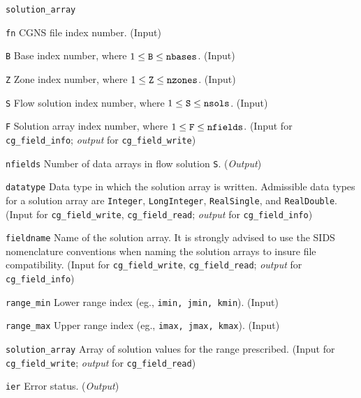 \begin{Ventryi}{\texttt{solution\_array}}\raggedright
\item [\texttt{fn}]
      CGNS file index number.
      (\textcolor{input}{Input})
\item [\texttt{B}]
      Base index number, where $1 \leq \text{\texttt{B}} \leq \text{\texttt{nbases}}$.
      (\textcolor{input}{Input})
\item [\texttt{Z}]
      Zone index number, where $1 \leq \text{\texttt{Z}} \leq \text{\texttt{nzones}}$.
      (\textcolor{input}{Input})
\item [\texttt{S}]
      Flow solution index number, where $1 \leq \text{\texttt{S}} \leq \text{\texttt{nsols}}$.
      (\textcolor{input}{Input})
\item [\texttt{F}]
      Solution array index number, where $1 \leq \text{\texttt{F}} \leq \text{\texttt{nfields}}$.
      (\textcolor{input}{Input} for \texttt{cg\_field\_info};
      \textcolor{output}{\textit{output}} for \texttt{cg\_field\_write})
\item [\texttt{nfields}]
      Number of data arrays in flow solution \texttt{S}.
      (\textcolor{output}{\textit{Output}})
\item [\texttt{datatype}]
      Data type in which the solution array is written.
      Admissible data types for a solution array are \texttt{Integer},
      \texttt{LongInteger}, \texttt{RealSingle}, and \texttt{RealDouble}.
      (\textcolor{input}{Input} for \texttt{cg\_field\_write},
      \texttt{cg\_field\_read};
      \textcolor{output}{\textit{output}} for \texttt{cg\_field\_info})
\item [\texttt{fieldname}]
      Name of the solution array.
      It is strongly advised to use the SIDS nomenclature conventions
      when naming the solution arrays to insure file compatibility.
      (\textcolor{input}{Input} for \texttt{cg\_field\_write},
      \texttt{cg\_field\_read};
      \textcolor{output}{\textit{output}} for \texttt{cg\_field\_info})
\item [\texttt{range\_min}]
      Lower range index (eg., \texttt{imin, jmin, kmin}).
      (\textcolor{input}{Input})
\item [\texttt{range\_max}]
      Upper range index (eg., \texttt{imax, jmax, kmax}).
      (\textcolor{input}{Input})
\item [\texttt{solution\_array}]
      Array of solution values for the range prescribed.
      (\textcolor{input}{Input} for \texttt{cg\_field\_write};
      \textcolor{output}{\textit{output}} for \texttt{cg\_field\_read})
\item [\texttt{ier}]
      Error status.
      (\textcolor{output}{\textit{Output}})
\end{Ventryi}

